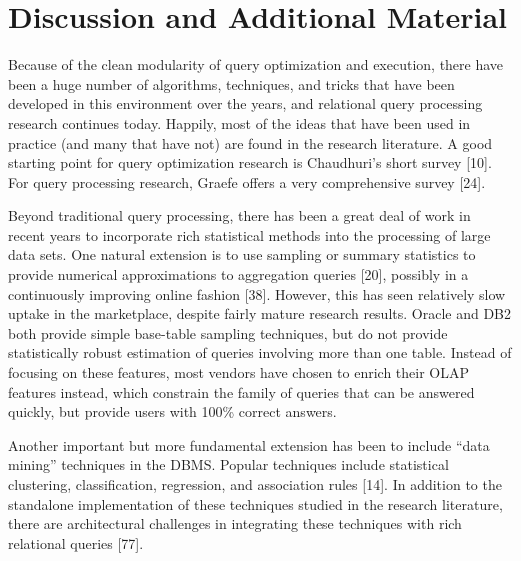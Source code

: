 \documentclass[a4paper,11pt,twoside,openright]{book}
\begin{document}
\hypertarget{discussion-and-additional-material-2}{%
\section{Discussion and Additional
Material}\label{discussion-and-additional-material-2}}

Because of the clean modularity of query optimization and execution,
there have been a huge number of algorithms, techniques, and tricks that
have been developed in this environment over the years, and relational
query processing research continues today. Happily, most of the ideas
that have been used in practice (and many that have not) are found in
the research literature. A good starting point for query optimization
research is Chaudhuri's short survey {[}10{]}. For query processing
research, Graefe offers a very comprehensive survey {[}24{]}.

Beyond traditional query processing, there has been a great deal of work
in recent years to incorporate rich statistical methods into the
processing of large data sets. One natural extension is to use sampling
or summary statistics to provide numerical approximations to aggregation
queries {[}20{]}, possibly in a continuously improving online fashion {[}38{]}.
However, this has seen relatively slow uptake in the marketplace,
despite fairly mature research results. Oracle and DB2 both provide
simple base-table sampling techniques, but do not provide
statistically robust estimation of queries involving more than one
table. Instead of focusing on these features, most vendors have chosen
to enrich their OLAP features instead, which constrain the family of
queries that can be answered quickly, but provide users with 100\%
correct answers.

Another important but more fundamental extension has been to include
``data mining'' techniques in the DBMS. Popular techniques include
statistical clustering, classification, regression, and association
rules {[}14{]}. In addition to the standalone implementation of these
techniques studied in the research literature, there are architectural
challenges in integrating these techniques with rich relational queries
{[}77{]}.
\end{document}
